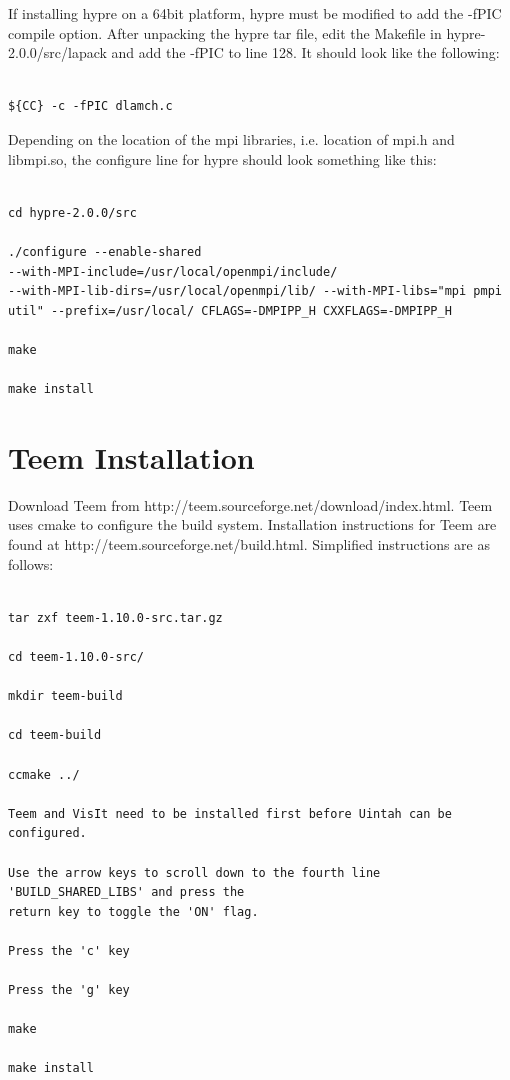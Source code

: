 \documentclass[12pt]{report}
\begin{document}
If installing hypre on a 64bit platform, hypre must be modified to add
the -fPIC compile option.  After unpacking the hypre tar file, edit
the Makefile in hypre-2.0.0/src/lapack and add the -fPIC to line 128.
It should look like the following:

\begin{verbatim}

${CC} -c -fPIC dlamch.c

\end{verbatim}

Depending on the location of the mpi libraries, i.e. location of mpi.h
and libmpi.so, the configure line for hypre should look something like this:

\begin{Verbatim}

cd hypre-2.0.0/src

./configure --enable-shared
--with-MPI-include=/usr/local/openmpi/include/
--with-MPI-lib-dirs=/usr/local/openmpi/lib/ --with-MPI-libs="mpi pmpi
util" --prefix=/usr/local/ CFLAGS=-DMPIPP_H CXXFLAGS=-DMPIPP_H

make

make install

\end{Verbatim}

 

\section{Teem Installation}
\label{sec:teem}


Download Teem from http://teem.sourceforge.net/download/index.html.  Teem uses cmake to configure the build system. Installation instructions for Teem are found at http://teem.sourceforge.net/build.html.  Simplified instructions are as follows:

\begin{verbatim}

tar zxf teem-1.10.0-src.tar.gz

cd teem-1.10.0-src/

mkdir teem-build

cd teem-build

ccmake ../

Teem and VisIt need to be installed first before Uintah can be configured.

Use the arrow keys to scroll down to the fourth line 'BUILD_SHARED_LIBS' and press the 
return key to toggle the 'ON' flag.

Press the 'c' key

Press the 'g' key

make

make install

\end{verbatim}
\end{document}

